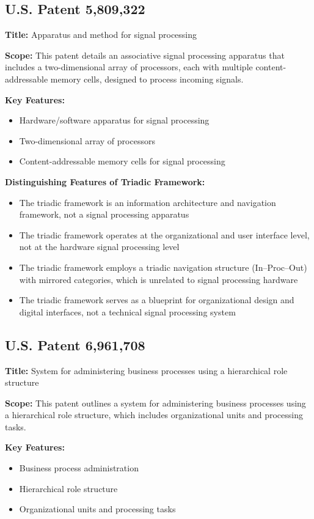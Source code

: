 \documentclass[11pt,a4paper]{article}
\begin{document}
\subsection*{U.S. Patent 5,809,322}
\textbf{Title:} Apparatus and method for signal processing

\textbf{Scope:} This patent details an associative signal processing apparatus that includes a two-dimensional array of processors, each with multiple content-addressable memory cells, designed to process incoming signals.

\textbf{Key Features:}
\begin{itemize}[noitemsep]
  \item Hardware/software apparatus for signal processing
  \item Two-dimensional array of processors
  \item Content-addressable memory cells for signal processing
\end{itemize}

\textbf{Distinguishing Features of Triadic Framework:}
\begin{itemize}[noitemsep]
  \item The triadic framework is an information architecture and navigation framework, not a signal processing apparatus
  \item The triadic framework operates at the organizational and user interface level, not at the hardware signal processing level
  \item The triadic framework employs a triadic navigation structure (In--Proc--Out) with mirrored categories, which is unrelated to signal processing hardware
  \item The triadic framework serves as a blueprint for organizational design and digital interfaces, not a technical signal processing system
\end{itemize}

\subsection*{U.S. Patent 6,961,708}
\textbf{Title:} System for administering business processes using a hierarchical role structure

\textbf{Scope:} This patent outlines a system for administering business processes using a hierarchical role structure, which includes organizational units and processing tasks.

\textbf{Key Features:}
\begin{itemize}[noitemsep]
  \item Business process administration
  \item Hierarchical role structure
  \item Organizational units and processing tasks
\end{itemize}
\end{document}
